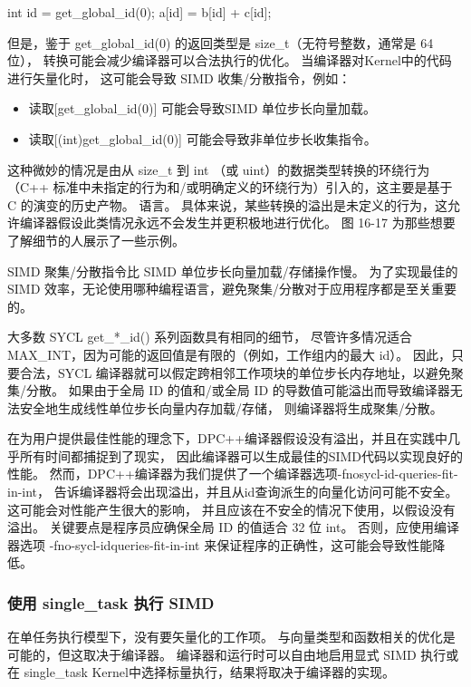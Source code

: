 int id = get\_global\_id(0); a[id] = b[id] + c[id];

但是，鉴于 get\_global\_id(0) 的返回类型是 size\_t（无符号整数，通常是 64 位），
转换可能会减少编译器可以合法执行的优化。 当编译器对Kernel中的代码进行矢量化时，
这可能会导致 SIMD 收集/分散指令，例如：

\begin{itemize}
	\item 读取[get\_global\_id(0)] 可能会导致SIMD 单位步长向量加载。

	\item 读取[(int)get\_global\_id(0)] 可能会导致非单位步长收集指令。
\end{itemize}

这种微妙的情况是由从 size\_t 到 int （或 uint）的数据类型转换的环绕行为
（C++ 标准中未指定的行为和/或明确定义的环绕行为）引入的，这主要是基于 C 的演变的历史产物。 
语言。 具体来说，某些转换的溢出是未定义的行为，这允许编译器假设此类情况永远不会发生并更积极地进行优化。 
图 16-17 为那些想要了解细节的人展示了一些示例。

SIMD 聚集/分散指令比 SIMD 单位步长向量加载/存储操作慢。 
为了实现最佳的 SIMD 效率，无论使用哪种编程语言，避免聚集/分散对于应用程序都是至关重要的。

大多数 SYCL get\_*\_id() 系列函数具有相同的细节，
尽管许多情况适合 MAX\_INT，因为可能的返回值是有限的（例如，工作组内的最大 id）。 
因此，只要合法，SYCL 编译器就可以假定跨相邻工作项块的单位步长内存地址，以避免聚集/分散。 
如果由于全局 ID 的值和/或全局 ID 的导数值可能溢出而导致编译器无法安全地生成线性单位步长向量内存加载/存储，
则编译器将生成聚集/分散。

在为用户提供最佳性能的理念下，DPC++编译器假设没有溢出，并且在实践中几乎所有时间都捕捉到了现实，
因此编译器可以生成最佳的SIMD代码以实现良好的性能。 
然而，DPC++编译器为我们提供了一个编译器选项-fnosycl-id-queries-fit-in-int，
告诉编译器将会出现溢出，并且从id查询派生的向量化访问可能不安全。 这可能会对性能产生很大的影响，
并且应该在不安全的情况下使用，以假设没有溢出。 关键要点是程序员应确保全局 ID 的值适合 32 位 int。 
否则，应使用编译器选项 -fno-sycl-idqueries-fit-in-int 来保证程序的正确性，这可能会导致性能降低。

\subsubsection{使用 single\_task 执行 SIMD}
在单任务执行模型下，没有要矢量化的工作项。 与向量类型和函数相关的优化是可能的，但这取决于编译器。 
编译器和运行时可以自由地启用显式 SIMD 执行或在 single\_task Kernel中选择标量执行，结果将取决于编译器的实现。

